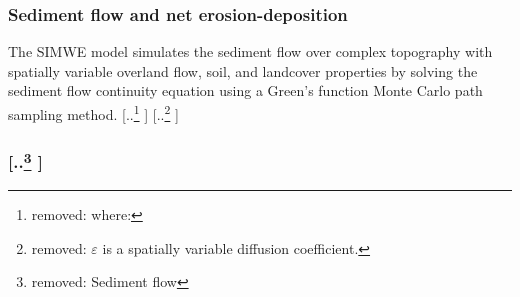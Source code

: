 \documentclass[gmd, manuscript]{copernicus}
\providecommand{\DIFadd}[1]{{\protect\color{blue} \sf #1}} %
\providecommand{\DIFdel}[1]{{\protect\color{red} [..\footnote{removed: #1} ]}} %
\providecommand{\DIFaddend}{} %
\providecommand{\DIFdelbegin}{} %
\begin{document}

\subsubsection{\DIFadd{Sediment flow and net erosion-deposition}}

\DIFadd{The SIMWE model simulates the sediment flow over complex topography 
with spatially variable overland flow, soil, and landcover properties 
by solving  the sediment flow continuity equation
}\DIFaddend using a Green's function Monte Carlo path sampling method.
\DIFdel{where: }%
\DIFdel{\hspace*{0.5em} $\varepsilon$ is a spatially variable diffusion coefficient. }%


\subsubsection{\DIFdel{Sediment flow}}
\addtocounter{subsubsection}{-1}%
\end{document}
